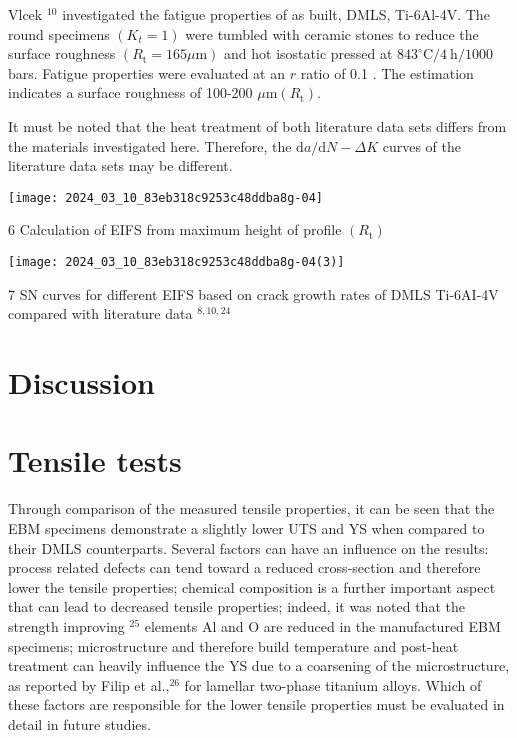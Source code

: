 \documentclass[10pt]{article}
\begin{document}
Vlcek ${ }^{10}$ investigated the fatigue properties of as built, DMLS, Ti-6Al-4V. The round specimens $\left(K_{t}=1\right)$ were tumbled with ceramic stones to reduce the surface roughness $\left(R_{\mathrm{t}}=165 \mu \mathrm{m}\right)$ and hot isostatic pressed at $843^{\circ} \mathrm{C} / 4 \mathrm{~h} / 1000$ bars. Fatigue properties were evaluated at an $r$ ratio of 0.1 . The estimation indicates a surface roughness of 100-200 $\mu \mathrm{m}\left(R_{\mathrm{t}}\right)$.

It must be noted that the heat treatment of both literature data sets differs from the materials investigated here. Therefore, the $\mathrm{d} a / \mathrm{d} N-\Delta K$ curves of the literature data sets may be different.

\begin{center}
\texttt{[image: 2024\_03\_10\_83eb318c9253c48ddba8g-04]}
\end{center}

6 Calculation of EIFS from maximum height of profile $\left(R_{\mathrm{t}}\right)$

\begin{center}
\texttt{[image: 2024\_03\_10\_83eb318c9253c48ddba8g-04(3)]}
\end{center}

7 SN curves for different EIFS based on crack growth rates of DMLS Ti-6AI-4V compared with literature data ${ }^{8,10,24}$

\section*{Discussion}
\section*{Tensile tests}
Through comparison of the measured tensile properties, it can be seen that the EBM specimens demonstrate a slightly lower UTS and YS when compared to their DMLS counterparts. Several factors can have an influence on the results: process related defects can tend toward a reduced cross-section and therefore lower the tensile properties; chemical composition is a further important aspect that can lead to decreased tensile properties; indeed, it was noted that the strength improving $^{25}$ elements $\mathrm{Al}$ and $\mathrm{O}$ are reduced in the manufactured EBM specimens; microstructure and therefore build temperature and post-heat treatment can heavily influence the YS due to a coarsening of the microstructure, as reported by Filip et al.,${ }^{26}$ for lamellar two-phase titanium alloys. Which of these factors are responsible for the lower tensile properties must be evaluated in detail in future studies.
\end{document}
